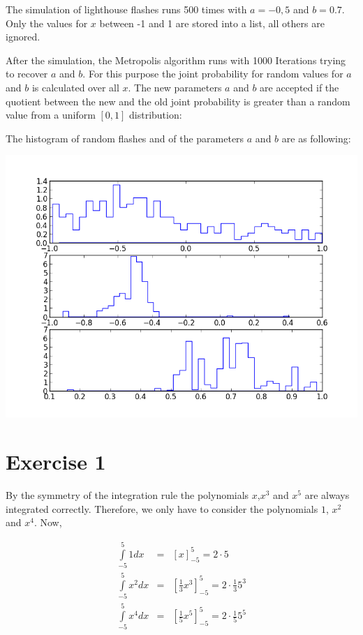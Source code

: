 \documentclass[%
]
{scrartcl}
\theoremstyle{plain}
\begin{document}
The simulation of lighthouse flashes runs 500 times with $a=-0,5$ and $b=0.7$. Only the values for $x$ between -1 and 1 are stored into a list, all others are ignored.

After the simulation, the Metropolis algorithm runs with 1000 Iterations trying to recover $a$ and $b$. For this purpose the joint probability for random values for $a$ and $b$ is calculated over all $x$. The new parameters $a$ and $b$ are accepted if the quotient between the new and the old joint probability is greater than a random value from a uniform $[0,1]$ distribution:



The histogram of random flashes and of the parameters $a$ and $b$ are as following:

\begin{center}
\centering
\includegraphics[width=0.6\linewidth]{../Lighthouse.png}
\end{center}

\section*{Exercise 1}

By the symmetry of the integration rule the polynomials $x$,$x^{3}$ and $x^{5}$ are always integrated correctly. Therefore, we only have to consider the polynomials $1$, $x^{2}$ and $x^{4}$. Now,

\begin{eqnarray*}
\int\limits_{-5}^{5}1dx&=&\left[x\right]^{5}_{-5}=2\cdot 5\\
\int\limits_{-5}^{5}x^{2}dx&=&\left[\frac{1}{3}x^{3}\right]^{5}_{-5}=2\cdot\frac{1}{3}5^{3}\\
\int\limits_{-5}^{5}x^{4}dx&=&\left[\frac{1}{5}x^{5}\right]^{5}_{-5}=2\cdot\frac{1}{5}5^{5}
\end{eqnarray*}
\end{document}
